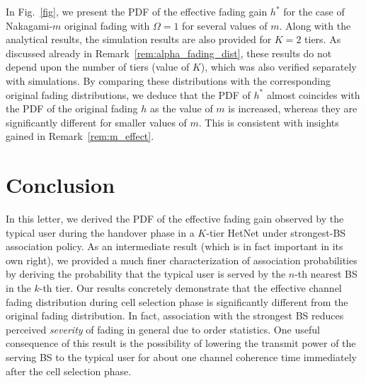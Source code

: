 \documentclass[final]{IEEEtran}
\begin{document}
In Fig.~\ref{fig}, we present the PDF of the effective fading gain $h^*$ for the case of Nakagami-$m$ original fading with $\Omega=1$ for several values of $m$. Along with the analytical results, the simulation results are also provided for $K=2$ tiers. As discussed already in Remark~\ref{rem:alpha_fading_dist}, these results do not depend upon the number of tiers (value of $K$), which was also verified separately with simulations.  
By comparing these distributions with the corresponding original fading distributions, we deduce that the PDF of $h^*$ almost coincides with the PDF of the original fading $h$ as the value of $m$ is increased, whereas they are significantly different for smaller values of $m$.  This is consistent with insights gained in Remark~\ref{rem:m_effect}.
\vspace{-3mm}
\section{Conclusion}
In this letter, we derived the PDF of the effective fading gain observed by the typical user during the handover phase in a $K$-tier HetNet under strongest-BS association policy. As an intermediate result  (which is in fact important in its own right), we provided a much finer characterization of association probabilities by deriving the probability that the typical user is served by the $n$-th nearest BS in the $k$-th tier. Our results concretely demonstrate that the effective channel fading distribution during cell selection phase is significantly different from the original fading distribution. In fact, association with the strongest BS reduces perceived {\em severity} of fading in general due to order statistics. 
One useful consequence of this result is the possibility of lowering the transmit power of the serving BS to the typical user for about one channel coherence time immediately after the cell selection phase.%
\vspace{-5mm}
\appendix
\end{document}
